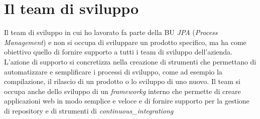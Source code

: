 \newpage

\section{Il team di sviluppo}
Il team di sviluppo in cui ho lavorato fa parte della BU \textit{JPA} (\textit{Process Management}) e non si
occupa di sviluppare un prodotto specifico, ma ha come obiettivo quello di fornire supporto a tutti i team di sviluppo
dell'azienda. \\
L'azione di supporto si concretizza nella creazione di strumenti che permettano di automatizzare e semplificare
i processi di sviluppo, come ad esempio la compilazione, il rilascio di un prodotto o lo sviluppo di uno nuovo.
Il team si occupa anche dello sviluppo di un \textit{\gls{frameworkg}} interno che permette di creare applicazioni web
in modo semplice e veloce e di fornire supporto per la gestione di repository e di strumenti di \textit{\gls{continuous_integrationg}}

